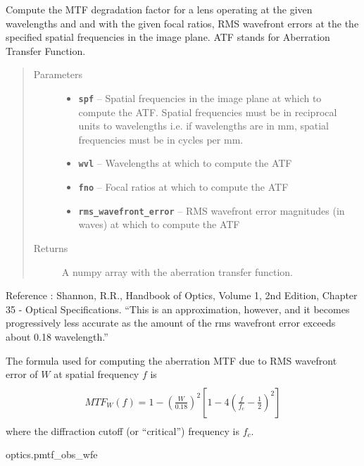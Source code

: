 \documentclass[a4paper,10pt,english]{sphinxmanual}
\begin{document}
\begin{fulllineitems}
\label{packages:optics.atf}
Compute the MTF degradation factor for a lens operating at the given wavelengths and and with the given
focal ratios, RMS wavefront errors at the the specified spatial frequencies in the image plane.
ATF stands for Aberration Transfer Function.
\begin{quote}\begin{description}
\item[{Parameters}] \leavevmode\begin{itemize}
\item {} 
\textbf{\texttt{spf}} -- Spatial frequencies in the image plane at which to compute the ATF. Spatial frequencies must be in
reciprocal units to wavelengths i.e. if wavelengths are in mm, spatial frequencies must be in cycles per mm.

\item {} 
\textbf{\texttt{wvl}} -- Wavelengths at which to compute the ATF

\item {} 
\textbf{\texttt{fno}} -- Focal ratios at which to compute the ATF

\item {} 
\textbf{\texttt{rms\_wavefront\_error}} -- RMS wavefront error magnitudes (in waves) at which to compute the ATF

\end{itemize}

\item[{Returns}] \leavevmode
A numpy array with the aberration transfer function.

\end{description}\end{quote}

Reference : Shannon, R.R., Handbook of Optics, Volume 1, 2nd Edition, Chapter 35 - Optical
Specifications. ``This is an approximation, however, and it becomes progressively less accurate as
the amount of the rms wavefront error exceeds about 0.18 wavelength.''

The formula used for computing the aberration MTF due to RMS wavefront error of \(W\) at spatial frequency
\(f\) is
\begin{align*}\begin{aligned}
\begin{split}M\!T\!F_{W}(f)=1-\left(\frac{W}{0.18}\right)^{2}\left[1-4\left(\frac{f}{f_{c}}-\frac{1}{2}\right)^{2}\right]\end{split}\end{aligned}\end{align*}
where the diffraction cutoff (or ``critical'') frequency is \(f_c\).




optics.pmtf\_obs\_wfe



\end{fulllineitems}
\end{document}
